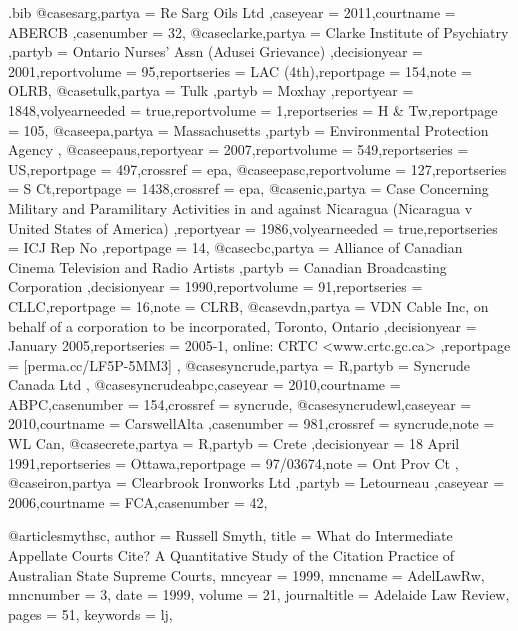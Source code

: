 \begin{filecontents*}{\jobname.bib}
@case{sarg,partya = {Re Sarg Oils Ltd },caseyear = {2011},courtname = {ABERCB },casenumber = {32},}
@case{clarke,partya = {Clarke Institute of Psychiatry },partyb = {Ontario Nurses' Assn (Adusei Grievance) },decisionyear = {2001},reportvolume = {95},reportseries = {LAC (4th)},reportpage = {154},note = {OLRB},}
@case{tulk,partya = {Tulk },partyb = {Moxhay },reportyear = {1848},volyearneeded = {true},reportvolume = {1},reportseries = {H \& Tw},reportpage = {105},}
@case{epa,partya = {Massachusetts },partyb = {Environmental Protection Agency },}
@case{epaus,reportyear = {2007},reportvolume = {549},reportseries = {US},reportpage = {497},crossref = {epa},}
@case{epasc,reportvolume = {127},reportseries = {S Ct},reportpage = {1438},crossref = {epa},}
@case{nic,partya = {Case Concerning Military and Paramilitary Activities in and against Nicaragua (Nicaragua v United States of America) },reportyear = {1986},volyearneeded = {true},reportseries = {ICJ Rep No },reportpage = {14},}
@case{cbc,partya = {Alliance of Canadian Cinema Television and Radio Artists },partyb = {Canadian Broadcasting Corporation },decisionyear = {1990},reportvolume = {91},reportseries = {CLLC},reportpage = {16},note = {CLRB},}
@case{vdn,partya = {VDN Cable Inc, on behalf of a corporation to be incorporated, Toronto, Ontario },decisionyear = {January 2005},reportseries = {2005-1, online: CRTC <www.crtc.gc.ca> },reportpage = {[perma.cc/LF5P-5MM3] },}
@case{syncrude,partya = {R},partyb = {Syncrude Canada Ltd },}
@case{syncrudeabpc,caseyear = {2010},courtname = {ABPC},casenumber = {154},crossref = {syncrude},}
@case{syncrudewl,caseyear = {2010},courtname = {CarswellAlta },casenumber = {981},crossref = {syncrude},note = {WL Can},}
@case{crete,partya = {R},partyb = {Crete },decisionyear = {18 April 1991},reportseries = {Ottawa},reportpage = {97/03674},note = {Ont Prov Ct },}
@case{iron,partya = {Clearbrook Ironworks Ltd },partyb = {Letourneau },caseyear = {2006},courtname = {FCA},casenumber = {42},}








@article{smythsc,
author = {Russell Smyth},
title = {What do Intermediate Appellate Courts Cite? A Quantitative Study of the Citation Practice of Australian State Supreme Courts},
mncyear = {1999},
mncname = {AdelLawRw},
mncnumber = {3},
date = {1999},
volume = {21},
journaltitle = {Adelaide Law Review},
pages = {51},
keywords = {lj},
}




\end{filecontents*}
